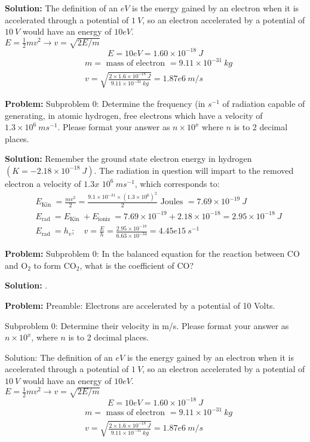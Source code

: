 \documentclass[10pt]{article}
\begin{document}
\textbf{Solution:}
The definition of an ${eV}$ is the energy gained by an electron when it is accelerated through a potential of $1 {~V}$, so an electron accelerated by a potential of $10 {~V}$ would have an energy of $10 {eV}$.\\
${E}=\frac{1}{2} m {v}^{2} \rightarrow {v}=\sqrt{2 {E} / {m}}$
\[
E=10 {eV}=1.60 \times 10^{-18} {~J}
\]
\[
\begin{aligned}
& {m}=\text { mass of electron }=9.11 \times 10^{-31} {~kg} \\
& v=\sqrt{\frac{2 \times 1.6 \times 10^{-18} {~J}}{9.11 \times 10^{-31} {~kg}}}= \boxed{1.87e6} {~m} / {s} 
\end{aligned}
\]


\textbf{Problem:}
Subproblem 0: Determine the frequency (in $s^{-1}$ of radiation capable of generating, in atomic hydrogen, free electrons which have a velocity of $1.3 \times 10^{6} {~ms}^{-1}$. Please format your answer as $n \times 10^x$ where $n$ is to 2 decimal places. 


\textbf{Solution:}
Remember the ground state electron energy in hydrogen $\left({K}=-2.18 \times 10^{-18} {~J}\right)$. The radiation in question will impart to the removed electron a velocity of $1.3 {x}$ $10^{6} {~ms}^{-1}$, which corresponds to:
\[
\begin{aligned}
&E_{\text {Kin }}=\frac{m v^{2}}{2}=\frac{9.1 \times 10^{-31} \times\left(1.3 \times 10^{6}\right)^{2}}{2} \text { Joules }=7.69 \times 10^{-19} {~J} \\
&E_{\text {rad }}=E_{\text {Kin }}+E_{\text {ioniz }}=7.69 \times 10^{-19}+2.18 \times 10^{-18}=2.95 \times 10^{-18} {~J} \\
&E_{\text {rad }}=h_{v} ; \quad v=\frac{E}{h}=\frac{2.95 \times 10^{-18}}{6.63 \times 10^{-34}}= \boxed{4.45e15} {~s}^{-1}
\end{aligned}
\]


\textbf{Problem:}
Subproblem 0: In the balanced equation for the reaction between $\mathrm{CO}$ and $\mathrm{O}_{2}$ to form $\mathrm{CO}_{2}$, what is the coefficient of $\mathrm{CO}$?


\textbf{Solution:}
.


\textbf{Problem:}
Preamble: Electrons are accelerated by a potential of 10 Volts.

Subproblem 0: Determine their velocity in m/s. Please format your answer as $n \times 10^x$, where $n$ is to 2 decimal places. 


Solution: The definition of an ${eV}$ is the energy gained by an electron when it is accelerated through a potential of $1 {~V}$, so an electron accelerated by a potential of $10 {~V}$ would have an energy of $10 {eV}$.\\
${E}=\frac{1}{2} m {v}^{2} \rightarrow {v}=\sqrt{2 {E} / {m}}$
\[
E=10 {eV}=1.60 \times 10^{-18} {~J}
\]
\[
\begin{aligned}
& {m}=\text { mass of electron }=9.11 \times 10^{-31} {~kg} \\
& v=\sqrt{\frac{2 \times 1.6 \times 10^{-18} {~J}}{9.11 \times 10^{-31} {~kg}}}= \boxed{1.87e6} {~m} / {s} 
\end{aligned}
\]
\end{document}
